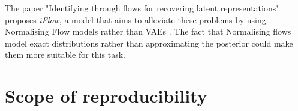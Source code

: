 The paper "Identifying through flows for recovering latent representations" proposes \textit{iFlow}, a model that aims to alleviate these problems by using Normalising Flow models rather than VAEs \cite{li2019identifying}. The fact that Normalising flows model exact distributions rather than approximating the posterior could make them more suitable for this task.

\section{Scope of reproducibility}
\label{sec:claims}





